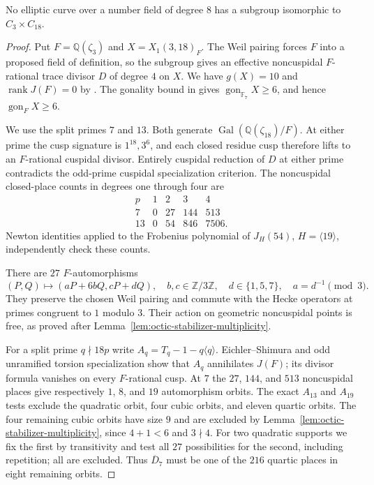 

\begin{proposition}\label{prop:octic-no318}
No elliptic curve over a number field of degree $8$ has a subgroup
isomorphic to $C_3\times C_{18}$.
\end{proposition}
\begin{proof}
Put $F=\mathbb Q(\zeta_3)$ and $X=X_1(3,18)_F$.
The Weil pairing forces $F$ into a proposed field of definition,
so the subgroup gives an effective noncuspidal $F$-rational
trace divisor $D$ of degree $4$ on $X$.
We have $g(X)=10$ and $\operatorname{rank}J(F)=0$ by
\cite[Theorem~4.1]{DS}. The gonality bound in \cite{NV}
gives $\operatorname{gon}_{\mathbb F_7}X\geq6$,
and hence $\operatorname{gon}_F X\geq6$.

We use the split primes $7$ and $13$.
Both generate $\operatorname{Gal}(\mathbb Q(\zeta_{18})/F)$.
At either prime the cusp signature is $1^{18},3^6$, and
each closed residue cusp therefore lifts to an $F$-rational
cuspidal divisor. Entirely cuspidal reduction of $D$ at either
prime contradicts the odd-prime cuspidal specialization criterion.
The noncuspidal closed-place counts in degrees one through four are
\[
 \begin{array}{c|rrrr}
 p&1&2&3&4\\\hline
 7&0&27&144&513\\
 13&0&54&846&7506.
 \end{array}
\]
Newton identities applied to the Frobenius polynomial of
$J_H(54)$, $H=\langle19\rangle$, independently check these counts.

There are $27$ $F$-automorphisms
\[
 (P,Q)\longmapsto(aP+6bQ,cP+dQ),\quad
 b,c\in\mathbb Z/3\mathbb Z,\quad d\in\{1,5,7\},
 \quad a=d^{-1}\pmod3.
\]
They preserve the chosen Weil pairing and commute with the Hecke
operators at primes congruent to $1$ modulo $3$.
Their action on geometric noncuspidal points is free, as proved
after Lemma~\ref{lem:octic-stabilizer-multiplicity}.

For a split prime $q\nmid18p$ write
$A_q=T_q-1-q\langle q\rangle$.
Eichler--Shimura and odd unramified torsion specialization show
that $A_q$ annihilates $J(F)$; its divisor formula vanishes on
every $F$-rational cusp. At $7$ the $27$, $144$, and $513$
noncuspidal places give respectively $1$, $8$, and $19$
automorphism orbits.
The exact $A_{13}$ and $A_{19}$ tests exclude the quadratic orbit,
four cubic orbits, and eleven quartic orbits.
The four remaining cubic orbits have size $9$ and are excluded
by Lemma~\ref{lem:octic-stabilizer-multiplicity}, since
$4+1<6$ and $3\nmid4$.
For two quadratic supports we fix the first by transitivity and
test all $27$ possibilities for the second, including repetition;
all are excluded. Thus $\overline D_7$ must be one of the $216$
quartic places in eight remaining orbits.


\end{proof}
